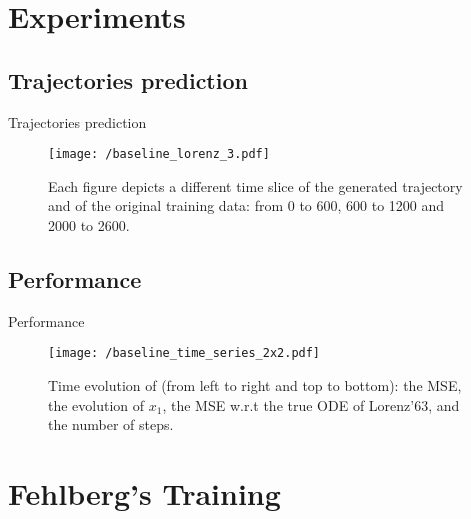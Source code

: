 \documentclass{EESD}
\begin{document}
\section{Experiments}

\subsection{Trajectories prediction}
\begin{frame}{Trajectories prediction}
    \begin{figure}
        \centering
        \hspace*{-1.5cm}
        \texttt{[image: /baseline\_lorenz\_3.pdf]}
        \caption{Each figure depicts a different time slice of the
          generated trajectory and of the original training data: from
          0 to 600, 600 to 1200 and 2000 to 2600.}
        \label{fig:lorenz}
    \end{figure}
\end{frame}


\subsection{Performance}
\begin{frame}{Performance}
    \begin{figure}
        \centering
        \texttt{[image: /baseline\_time\_series\_2x2.pdf]}
        \caption{Time evolution of (from left to right and top to bottom): the MSE, the evolution of $x_1$, the MSE w.r.t the true ODE of Lorenz’63, and the number of steps.}
        \label{fig:lorenz_error}
    \end{figure}                                                    
\end{frame}

\section{Fehlberg's Training}
\end{document}
